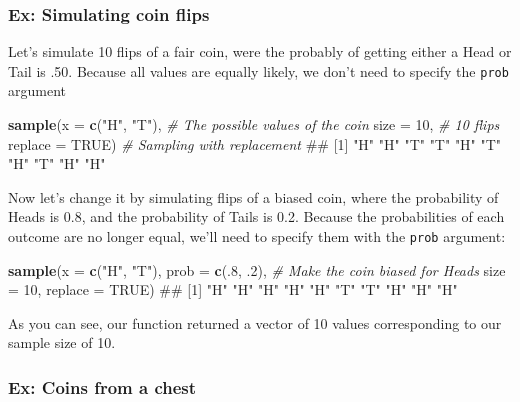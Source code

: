 \documentclass[]{book}
\newenvironment{Shaded}{\begin{snugshade}}{\end{snugshade}}
\newcommand{\KeywordTok}[1]{\textcolor[rgb]{0.13,0.29,0.53}{\textbf{#1}}}
\newcommand{\DataTypeTok}[1]{\textcolor[rgb]{0.13,0.29,0.53}{#1}}
\newcommand{\DecValTok}[1]{\textcolor[rgb]{0.00,0.00,0.81}{#1}}
\newcommand{\StringTok}[1]{\textcolor[rgb]{0.31,0.60,0.02}{#1}}
\newcommand{\CommentTok}[1]{\textcolor[rgb]{0.56,0.35,0.01}{\textit{#1}}}
\newcommand{\OtherTok}[1]{\textcolor[rgb]{0.56,0.35,0.01}{#1}}
\newcommand{\NormalTok}[1]{#1}
\theoremstyle{definition}
\theoremstyle{definition}
\theoremstyle{remark}
\begin{document}
\subsubsection{Ex: Simulating coin
flips}\label{ex-simulating-coin-flips}

Let's simulate 10 flips of a fair coin, were the probably of getting
either a Head or Tail is .50. Because all values are equally likely, we
don't need to specify the \texttt{prob} argument

\begin{Shaded}
\begin{Highlighting}[]
\KeywordTok{sample}\NormalTok{(}\DataTypeTok{x =} \KeywordTok{c}\NormalTok{(}\StringTok{"H"}\NormalTok{, }\StringTok{"T"}\NormalTok{), }\CommentTok{# The possible values of the coin}
       \DataTypeTok{size =} \DecValTok{10}\NormalTok{,  }\CommentTok{# 10 flips}
       \DataTypeTok{replace =} \OtherTok{TRUE}\NormalTok{) }\CommentTok{# Sampling with replacement}
\NormalTok{##  [1] "H" "H" "T" "T" "H" "T" "H" "T" "H" "H"}
\end{Highlighting}
\end{Shaded}

Now let's change it by simulating flips of a biased coin, where the
probability of Heads is 0.8, and the probability of Tails is 0.2.
Because the probabilities of each outcome are no longer equal, we'll
need to specify them with the \texttt{prob} argument:

\begin{Shaded}
\begin{Highlighting}[]
\KeywordTok{sample}\NormalTok{(}\DataTypeTok{x =} \KeywordTok{c}\NormalTok{(}\StringTok{"H"}\NormalTok{, }\StringTok{"T"}\NormalTok{),}
       \DataTypeTok{prob =} \KeywordTok{c}\NormalTok{(.}\DecValTok{8}\NormalTok{, .}\DecValTok{2}\NormalTok{), }\CommentTok{# Make the coin biased for Heads}
       \DataTypeTok{size =} \DecValTok{10}\NormalTok{,}
       \DataTypeTok{replace =} \OtherTok{TRUE}\NormalTok{)}
\NormalTok{##  [1] "H" "H" "H" "H" "H" "T" "T" "H" "H" "H"}
\end{Highlighting}
\end{Shaded}

As you can see, our function returned a vector of 10 values
corresponding to our sample size of 10.

\subsubsection{Ex: Coins from a chest}\label{ex-coins-from-a-chest}
\end{document}

